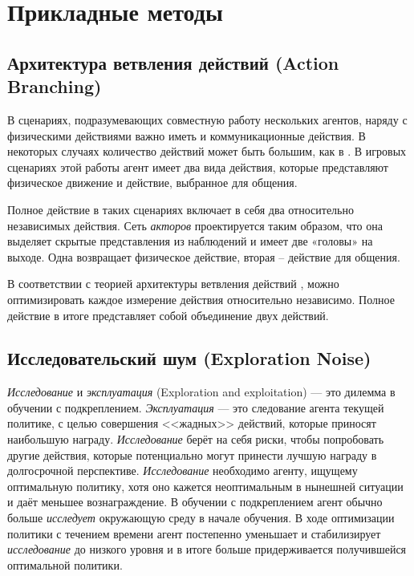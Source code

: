 \section{Прикладные методы}

\subsection{Архитектура ветвления действий (Action Branching)}

В сценариях, подразумевающих совместную работу нескольких агентов, наряду с физическими действиями важно иметь и коммуникационные действия. В некоторых случаях количество действий может быть большим, как в \cite{tavakoli2017action}. В игровых сценариях этой работы агент имеет два вида действия, которые представляют физическое движение и действие, выбранное для общения.

Полное действие в таких сценариях включает в себя два относительно независимых действия. Сеть \textit{акторов} проектируется таким образом, что она выделяет скрытые представления из наблюдений и имеет две «головы» на выходе. Одна возвращает физическое действие, вторая – действие для общения.

В соответствии с теорией архитектуры ветвления действий \cite{tavakoli2017action}, можно оптимизировать каждое измерение действия относительно независимо. Полное действие в итоге представляет собой объединение двух действий.

\subsection{Исследовательский шум (Exploration Noise)}

\textit{Исследование} и \textit{эксплуатация} (Exploration and exploitation) — это дилемма в обучении с подкреплением. \textit{Эксплуатация} — это следование агента текущей политике, с целью совершения <<жадных>> действий, которые приносят наибольшую награду. \textit{Исследование} берёт на себя риски, чтобы попробовать другие действия, которые потенциально могут принести лучшую награду в долгосрочной перспективе. \textit{Исследование} необходимо агенту, ищущему оптимальную политику, хотя оно кажется неоптимальным в нынешней ситуации и даёт меньшее вознаграждение. В обучении с подкреплением агент обычно больше \textit{исследует} окружающую среду в начале обучения. В ходе оптимизации политики с течением времени агент постепенно уменьшает и стабилизирует \textit{исследование} до низкого уровня и в итоге больше придерживается получившейся оптимальной политики.

